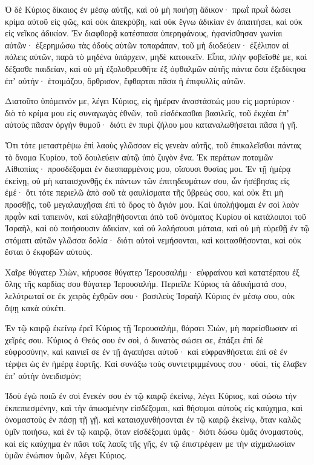 \begin{spacing}{1.1}
\begin{multicols}{2}
Ὁ δὲ Κύριος δίκαιος ἐν μέσῳ αὐτῆς, καὶ οὐ μὴ ποιήσῃ ἄδικον· πρωῒ πρωῒ δώσει κρίμα αὐτοῦ εἰς φῶς, καὶ οὐκ ἀπεκρύβη, καὶ οὐκ ἔγνω ἀδικίαν ἐν ἀπαιτήσει, καὶ οὐκ εἰς νεῖκος ἀδικίαν.
Ἐν διαφθορᾷ κατέσπασα ὑπερηφάνους, ἠφανίσθησαν γωνίαι αὐτῶν· ἐξερημώσω τὰς ὁδοὺς αὐτῶν τοπαράπαν, τοῦ μὴ διοδεύειν· ἐξέλιπον αἱ πόλεις αὐτῶν, παρὰ τὸ μηδένα ὑπάρχειν, μηδὲ κατοικεῖν.
Εἶπα, πλὴν φοβεῖσθέ με, καὶ δέξασθε παιδείαν, καὶ οὐ μὴ ἐξολοθρευθῆτε ἐξ ὀφθαλμῶν αὐτῆς πάντα ὅσα ἐξεδίκησα ἐπʼ αὐτήν· ἑτοιμάζου, ὄρθρισον, ἔφθαρται πᾶσα ἡ ἐπιφυλλὶς αὐτῶν.

Διατοῦτο ὑπόμεινόν με, λέγει Κύριος, εἰς ἡμέραν ἀναστάσεώς μου εἰς μαρτύριον· διὸ τὸ κρίμα μου εἰς συναγωγὰς ἐθνῶν, τοῦ εἰσδέκασθαι βασιλεῖς, τοῦ ἐκχέαι ἐπʼ αὐτοὺς πᾶσαν ὀργὴν θυμοῦ· διότι ἐν πυρὶ ζήλου μου καταναλωθήσεται πᾶσα ἡ γῆ.

Ὅτι τότε μεταστρέψω ἐπὶ λαοὺς γλῶσσαν εἰς γενεὰν αὐτῆς, τοῦ ἐπικαλεῖσθαι πάντας τὸ ὄνομα Κυρίου, τοῦ δουλεύειν αὐτῷ ὑπὸ ζυγὸν ἕνα.
Ἐκ περάτων ποταμῶν Αἰθιοπίας· προσδέξομαι ἐν διεσπαρμένοις μου, οἴσουσι θυσίας μοι.
Ἐν τῇ ἡμέρᾳ ἐκείνῃ, οὐ μὴ καταισχυνθῇς ἐκ πάντων τῶν ἐπιτηδευμάτων σου, ὧν ἠσέβησας εἰς ἐμέ· ὅτι τότε περιελῶ ἀπὸ σοῦ τὰ φαυλίσματα τῆς ὕβρεώς σου, καὶ οὐκ ἔτι μὴ προσθῇς, τοῦ μεγαλαυχῆσαι ἐπὶ τὸ ὄρος τὸ ἅγιόν μου.
Καὶ ὑπολήψομαι ἐν σοὶ λαὸν πρᾳῢν καὶ ταπεινὸν, καὶ εὐλαβηθήσονται ἀπὸ τοῦ ὀνόματος Κυρίου
οἱ κατάλοιποι τοῦ Ἰσραὴλ, καὶ οὐ ποιήσουσιν ἀδικίαν, καὶ οὐ λαλήσουσι μάταια, καὶ οὐ μὴ εὑρεθῇ ἐν τῷ στόματι αὐτῶν γλῶσσα δολία· διότι αὐτοὶ νεμήσονται, καὶ κοιτασθήσονται, καὶ οὐκ ἔσται ὁ ἐκφοβῶν αὐτούς.

Χαῖρε θύγατερ Σιὼν, κήρυσσε θύγατερ Ἱερουσαλήμ· εὐφραίνου καὶ κατατέρπου ἐξ ὅλης τῆς καρδίας σου θύγατερ Ἱερουσαλήμ.
Περιεῖλε Κύριος τὰ ἀδικήματά σου, λελύτρωταί σε ἐκ χειρὸς ἐχθρῶν σου· βασιλεὺς Ἰσραὴλ Κύριος ἐν μέσῳ σου, οὐκ ὄψῃ κακὰ οὐκέτι.

Ἐν τῷ καιρῷ ἐκείνῳ ἐρεῖ Κύριος τῇ Ἱερουσαλὴμ, θάρσει Σιὼν, μὴ παρείσθωσαν αἱ χεῖρές σου.
Κύριος ὁ Θεός σου ἐν σοὶ, ὁ δυνατὸς σώσει σε, ἐπάξει ἐπὶ δὲ εὐφροσύνην, καὶ καινιεῖ σε ἐν τῇ ἀγαπήσει αὐτοῦ· καὶ εὐφρανθήσεται ἐπὶ σὲ ἐν τέρψει ὡς ἐν ἡμέρᾳ ἑορτῆς.
Καὶ συνάξω τοὺς συντετριμμένους σου· οὐαὶ, τίς ἔλαβεν ἐπʼ αὐτὴν ὀνειδισμόν;

Ἰδοὺ ἐγὼ ποιῶ ἐν σοὶ ἔνεκέν σου ἐν τῷ καιρῷ ἐκείνῳ, λέγει Κύριος, καὶ σώσω τὴν ἐκπεπιεσμένην, καὶ τὴν ἀπωσμένην εἰσδέξομαι, καὶ θήσομαι αὐτοὺς εἰς καύχημα, καὶ ὀνομαστοὺς ἐν πάσῃ τῇ γῇ.
καὶ καταισχυνθήσονται ἐν τῷ καιρῷ ἐκείνῳ, ὅταν καλῶς ὑμῖν ποιήσω, καὶ ἐν τῷ καιρῷ, ὅταν εἰσδέξομαι ὑμᾶς· διότι δώσω ὑμᾶς ὀνομαστοὺς, καὶ εἰς καύχημα ἐν πᾶσι τοῖς λαοῖς τῆς γῆς, ἐν τῷ ἐπιστρέφειν με τὴν αἰχμαλωσίαν ὑμῶν ἐνώπιον ὑμῶν, λέγει Κύριος.



\end{multicols}
\end{spacing}
